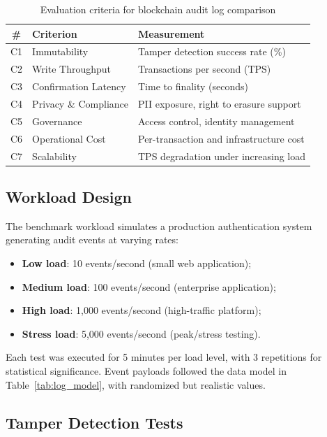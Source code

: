 \documentclass[12pt,a4paper]{article}
\begin{document}
\begin{table}[H]
\centering
\caption{Evaluation criteria for blockchain audit log comparison}
\label{tab:criteria}
\begin{tabular}{@{}clp{6cm}@{}}
\toprule
\textbf{\#} & \textbf{Criterion} & \textbf{Measurement} \\
\midrule
C1 & Immutability           & Tamper detection success rate (\%) \\
C2 & Write Throughput        & Transactions per second (TPS) \\
C3 & Confirmation Latency    & Time to finality (seconds) \\
C4 & Privacy \& Compliance   & PII exposure, right to erasure support \\
C5 & Governance              & Access control, identity management \\
C6 & Operational Cost        & Per-transaction and infrastructure cost \\
C7 & Scalability             & TPS degradation under increasing load \\
\bottomrule
\end{tabular}
\end{table}

\subsection{Workload Design}

The benchmark workload simulates a production authentication system generating audit events at varying rates:

\begin{itemize}
    \item \textbf{Low load}: 10 events/second (small web application);
    \item \textbf{Medium load}: 100 events/second (enterprise application);
    \item \textbf{High load}: 1,000 events/second (high-traffic platform);
    \item \textbf{Stress load}: 5,000 events/second (peak/stress testing).
\end{itemize}

Each test was executed for 5 minutes per load level, with 3 repetitions for statistical significance. Event payloads followed the data model in Table~\ref{tab:log_model}, with randomized but realistic values.

\subsection{Tamper Detection Tests}
\end{document}
